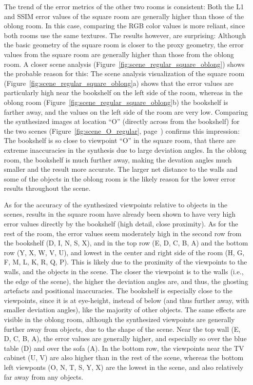 The trend of the error metrics of the other two rooms is consistent: Both the L1 and SSIM error values of the square room are generally higher than those of the oblong room. In this case, comparing the RGB color values is more reliant, since both rooms use the same textures. The results however, are surprising: Although the basic geometry of the square room is closer to the proxy geometry, the error values from the square room are generally higher than those from the oblong room.
A closer scene analysis (Figure~\ref{fig:scene_regular_square_oblong}) shows the probable reason for this: The scene analysis visualization of the square room (Figure~\ref{fig:scene_regular_square_oblong}a) shows that the error values are particularly high near the bookshelf on the left side of the room, whereas in the oblong room (Figure~\ref{fig:scene_regular_square_oblong}b) the bookshelf is farther away, and the values on the left side of the room are very low.
Comparing the synthesized images at location ``O'' (directly across from the bookshelf) for the two scenes (Figure~\ref{fig:scene_O_regular}, page~\pageref{fig:scene_O_regular}) confirms this impression: The bookshelf is so close to viewpoint ``O'' in the square room, that there are extreme inaccuracies in the synthesis due to large deviation angles. In the oblong room, the bookshelf is much further away, making the devation angles much smaller and the result more accurate. The larger net distance to the walls and some of the objects in the oblong room is the likely reason for the lower error results throughout the scene.

As for the accuracy of the synthesized viewpoints relative to objects in the scenes, results in the square room have already been shown to have very high error values directly by the bookshelf (high detail, close proximity). As for the rest of the room, the error values seem moderately high in the second row from the bookshelf (D, I, N, S, X), and in the top row (E, D, C, B, A) and the bottom row (Y, X, W, V, U), and lowest in the center and right side of the room (H, G, F, M, L, K, R, Q, P). This is likely due to the proximity of the viewpoints to the walls, and the objects in the scene. The closer the viewpoint is to the walls (i.e., the edge of the scene), the higher the deviation angles are, and thus, the ghosting artefacts and positional inaccuracies. The bookshelf is especially close to the viewpoints, since it is at eye-height, instead of below (and thus further away, with smaller deviation angles), like the majority of other objects.
The same effects are visible in the oblong room, although the synthesized viewpoints are generally further away from objects, due to the shape of the scene. Near the top wall (E, D, C, B, A), the error values are generally higher, and especially so over the blue table (D) and over the sofa (A). In the bottom row, the viewpoints near the TV cabinet (U, V) are also higher than in the rest of the scene, whereas the bottom left viewponts (O, N, T, S, Y, X) are the lowest in the scene, and also relatively far away from any objects.

